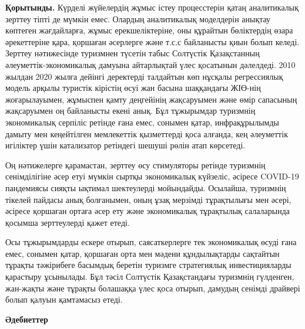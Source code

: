 \begin{multicols}{2}
{\bfseries Қорытынды.} Күрделі жүйелердің жұмыс істеу процесстерін қатаң
аналитикалық зерттеу тіпті де мүмкін емес. Олардың аналитикалық
моделдерін анықтау көптеген жағдайларға, жұмыс ерекшеліктеріне, оны
құрайтын бөліктердің өзара әрекеттеріне қара, қоршаған әсерлерге және
т.с.с байланысты қиын болып келеді. Зерттеу нәтижесінде туризмнен
түсетін табыс Солтүстік Қазақстанның әлеуметтік-экономикалық дамуына
айтарлықтай үлес қосатынын дәлелдеді. 2010 жылдан 2020 жылға дейінгі
деректерді талдайтын көп нұсқалы регрессиялық модель арқылы туристік
кірістің өсуі жан басына шаққандағы ЖІӨ-нің жоғарылауымен, жұмыспен
қамту деңгейінің жақсаруымен және өмір сапасының жақсаруымен оң
байланысты екені анық. Бұл тұжырымдар туризмнің экономикалық серпіліс
ретінде ғана емес, сонымен қатар, инфрақұрылымды дамыту мен кеңейтілген
мемлекеттік қызметтерді қоса алғанда, кең әлеуметтік игіліктер үшін
катализатор ретіндегі шешуші рөлін атап көрсетеді.

Оң нәтижелерге қарамастан, зерттеу өсу стимуляторы ретінде туризмнің
сенімділігіне әсер етуі мүмкін сыртқы экономикалық күйзеліс, әсіресе
COVID-19 пандемиясы сияқты ықтимал шектеулерді мойындайды. Осылайша,
туризмнің тікелей пайдасы анық болғанымен, оның ұзақ мерзімді
тұрақтылығы мен әсері, әсіресе қоршаған ортаға әсер ету және
экономикалық тұрақтылық салаларында қосымша зерттеулерді қажет етеді.

Осы тұжырымдарды ескере отырып, саясаткерлерге тек экономикалық өсуді
ғана емес, сонымен қатар, қоршаған орта мен мәдени құндылықтарды
сақтайтын тұрақты тәжірибеге басымдық беретін туризмге стратегиялық
инвестицияларды қарастыру ұсынылады. Бұл тәсіл Солтүстік Қазақстандағы
туризмнің гүлденген, жан-жақты және тұрақты болашаққа үлес қоса отырып,
дамудың сенімді драйвері болып қалуын қамтамасыз етеді.
\end{multicols}

\begin{center}
{\bfseries Әдебиеттер}
\end{center}


